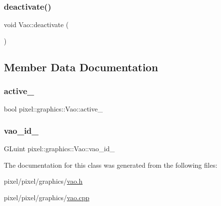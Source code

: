 \subsubsection{\texorpdfstring{deactivate()}{deactivate()}}
{\footnotesize\ttfamily void Vao\+::deactivate (\begin{DoxyParamCaption}{ }\end{DoxyParamCaption})}



\subsection{Member Data Documentation}
\mbox{\label{classpixel_1_1graphics_1_1_vao_ade88abb2c0c25f568a34d8256f7eb6ce}} 
\subsubsection{\texorpdfstring{active\+\_\+}{active\_}}
{\footnotesize\ttfamily bool pixel\+::graphics\+::\+Vao\+::active\+\_\+}

\mbox{\label{classpixel_1_1graphics_1_1_vao_a159a7fd883408fcad068f06bf563339b}} 
\subsubsection{\texorpdfstring{vao\+\_\+id\+\_\+}{vao\_id\_}}
{\footnotesize\ttfamily G\+Luint pixel\+::graphics\+::\+Vao\+::vao\+\_\+id\+\_\+}



The documentation for this class was generated from the following files\+:\begin{DoxyCompactItemize}
\item 
pixel/pixel/graphics/\hyperlink{vao_8h}{vao.\+h}\item 
pixel/pixel/graphics/\hyperlink{vao_8cpp}{vao.\+cpp}\end{DoxyCompactItemize}
